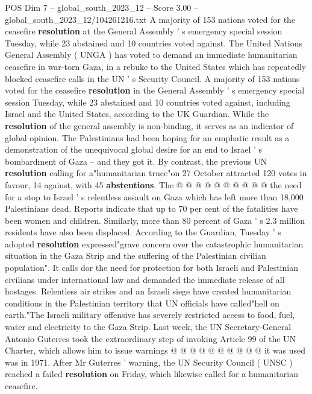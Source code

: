 \begin{textsample}{POS Dim 7 – global\_south\_2023\_12 – Score 3.00 – global\_south\_2023\_12/104261216.txt}  \label{ex:f7_pos_034}
A majority of 153 nations voted for the ceasefire \textbf{resolution} at the General Assembly ' s emergency special session Tuesday, while 23 abstained and 10 countries voted against.
The United Nations General Assembly ( UNGA ) has voted to demand an immediate humanitarian ceasefire in war-torn Gaza, in a rebuke to the United States which has repeatedly blocked ceasefire calls in the UN ' s Security Council.
A majority of 153 nations voted for the ceasefire \textbf{resolution} in the General Assembly ' s emergency special session Tuesday, while 23 abstained and 10 countries voted against, including Israel and the United States, according to the UK Guardian.
While the \textbf{resolution} of the general assembly is non-binding, it serves as an indicator of global opinion.
The Palestinians had been hoping for an emphatic result as a demonstration of the unequivocal global desire for an end to Israel ' s bombardment of Gaza -- and they got it.
By contrast, the previous UN \textbf{resolution} calling for a"humanitarian truce"on 27 October attracted 120 votes in favour, 14 against, with 45 \textbf{abstentions}.
The @ @ @ @ @ @ @ @ @ @ the need for a stop to Israel ' s relentless assault on Gaza which has left more than 18,000 Palestinians dead.
Reports indicate that up to 70 per cent of the fatalities have been women and children.
Similarly, more than 80 percent of Gaza ' s 2.3 million residents have also been displaced.
According to the Guardian, Tuesday ' s adopted \textbf{resolution} expressed"grave concern over the catastrophic humanitarian situation in the Gaza Strip and the suffering of the Palestinian civilian population".
It calls dor the need for protection for both Israeli and Palestinian civilians under international law and demanded the immediate release of all hostages.
Relentless air strikes and an Israeli siege have created humanitarian conditions in the Palestinian territory that UN officials have called"hell on earth."The Israeli military offensive has severely restricted access to food, fuel, water and electricity to the Gaza Strip.
Last week, the UN Secretary-General Antonio Guterres took the extraordinary step of invoking Article 99 of the UN Charter, which allows him to issue warnings @ @ @ @ @ @ @ @ @ @ it was used was in 1971.
After Mr Guterres ' warning, the UN Security Council ( UNSC ) reached a failed \textbf{resolution} on Friday, which likewise called for a humanitarian ceasefire.

\end{textsample}
